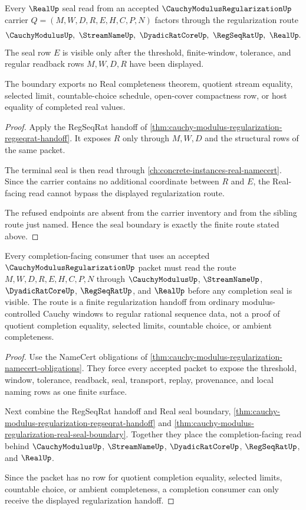 \begin{theorem}
\label{thm:cauchy-modulus-regularization-real-seal-boundary}
Every $\RealUp$ seal read from an accepted $\CauchyModulusRegularizationUp$ carrier $Q=(M,W,D,R,E,H,C,P,N)$ factors through the regularization route
$$
\CauchyModulusUp,\ \StreamNameUp,\ \DyadicRatCoreUp,\ \RegSeqRatUp,\ \RealUp .
$$
The seal row $E$ is visible only after the threshold, finite-window, tolerance, and regular readback rows $M,W,D,R$ have been displayed.

The boundary exports no Real completeness theorem, quotient stream equality, selected limit, countable-choice schedule, open-cover compactness row, or host equality of completed real values.
\end{theorem}
\begin{proof}
Apply the RegSeqRat handoff of \autoref{thm:cauchy-modulus-regularization-regseqrat-handoff}. It exposes $R$ only through $M,W,D$ and the structural rows of the same packet.

The terminal seal is then read through \autoref{ch:concrete-instances-real-namecert}. Since the carrier contains no additional coordinate between $R$ and $E$, the Real-facing read cannot bypass the displayed regularization route.

The refused endpoints are absent from the carrier inventory and from the sibling route just named. Hence the seal boundary is exactly the finite route stated above.
\end{proof}

\begin{theorem}
\label{thm:cauchy-modulus-regularization-completion-consumer}
Every completion-facing consumer that uses an accepted $\CauchyModulusRegularizationUp$ packet must read the route $M,W,D,R,E,H,C,P,N$ through $\CauchyModulusUp$, $\StreamNameUp$, $\DyadicRatCoreUp$, $\RegSeqRatUp$, and $\RealUp$ before any completion seal is visible. The route is a finite regularization handoff from ordinary modulus-controlled Cauchy windows to regular rational sequence data, not a proof of quotient completion equality, selected limits, countable choice, or ambient completeness.
\end{theorem}
\begin{proof}
Use the NameCert obligations of \autoref{thm:cauchy-modulus-regularization-namecert-obligations}. They force every accepted packet to expose the threshold, window, tolerance, readback, seal, transport, replay, provenance, and local naming rows as one finite surface.

Next combine the RegSeqRat handoff and Real seal boundary, \autoref{thm:cauchy-modulus-regularization-regseqrat-handoff} and \autoref{thm:cauchy-modulus-regularization-real-seal-boundary}. Together they place the completion-facing read behind $\CauchyModulusUp$, $\StreamNameUp$, $\DyadicRatCoreUp$, $\RegSeqRatUp$, and $\RealUp$.

Since the packet has no row for quotient completion equality, selected limits, countable choice, or ambient completeness, a completion consumer can only receive the displayed regularization handoff.
\end{proof}

